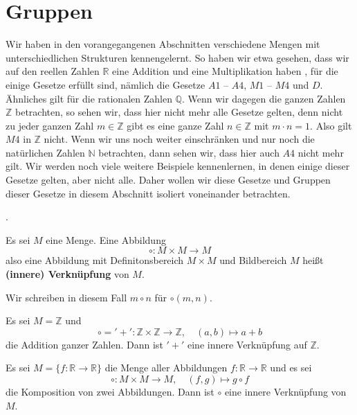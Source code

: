 \section{Gruppen}\label{section_gruppe}

\setcounter{definition}{0}
\setcounter{beispiel}{0}
\setcounter{notiz}{0}

Wir haben in den vorangegangenen Abschnitten verschiedene Mengen mit unterschiedlichen Strukturen kennengelernt. 
So haben wir etwa gesehen, dass wir auf den reellen Zahlen $\mathbb R$ eine Addition und eine Multiplikation 
haben , für die einige Gesetze erfüllt sind, nämlich die Gesetze $A1$ -- $A4$, $M1$ -- $M4$ und $D$. 
Ähnliches gilt für die rationalen Zahlen $\mathbb Q$. Wenn wir dagegen die ganzen Zahlen $\mathbb Z$ 
betrachten, so sehen wir, dass hier nicht mehr alle Gesetze gelten, denn nicht zu jeder ganzen Zahl $m \in 
\mathbb Z$ gibt es eine ganze Zahl $n \in \mathbb Z$ mit $m \cdot n = 1$. Also gilt $M4$ in $\mathbb Z$ 
nicht. Wenn wir uns noch weiter einschränken und nur noch die natürlichen Zahlen $\mathbb N$ betrachten, 
dann sehen wir, dass hier auch $A4$ nicht mehr gilt. Wir werden noch viele weitere Beispiele kennenlernen, 
in denen einige dieser Gesetze gelten, aber nicht alle. Daher wollen wir diese Gesetze und Gruppen dieser 
Gesetze in diesem Abschnitt isoliert voneinander betrachten.

\medbreak.

\begin{definition} Es sei $M$ eine Menge. Eine Abbildung 
  	$$ \circ : M \times M \longrightarrow M $$
also eine Abbildung mit Definitonsbereich $M \times M$ und Bildbereich $M$ heißt 
\textbf{(innere) Verknüpfung} von $M$. 

Wir schreiben in diesem Fall $m \circ n$ für $\circ(m,n)$.
\end{definition}

\begin{beispiel} Es sei $M = \mathbb Z$ und 
  	$$ \circ = '+': \mathbb Z \times \mathbb Z \longrightarrow \mathbb Z, \quad (a,b) \longmapsto a + b $$
die Addition ganzer Zahlen. Dann ist $'+'$ eine innere Verknüpfung auf $\mathbb Z$.
\end{beispiel}

\begin{beispiel}\label{gruppe_monoid_abbild} 
Es sei $M = \{f: \mathbb R \longrightarrow \mathbb R \}$ die Menge aller Abbildungen 
$f: \mathbb R \longrightarrow \mathbb R$ und es sei  
  	$$ \circ : M \times M \longrightarrow M, \quad (f, g) \longmapsto g \circ f $$
die Komposition von zwei Abbildungen. Dann ist $\circ$ eine innere Verknüpfung von $M$.
\end{beispiel}

